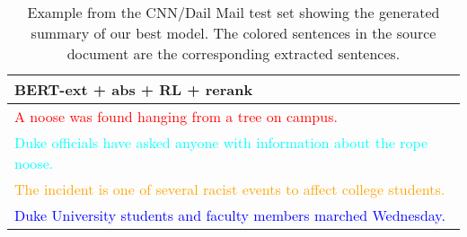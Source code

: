 \documentclass[11pt,a4paper]{article}
\begin{document}
\begin{table*}
\begin{adjustbox}{width=\textwidth}
\begin{tabular}{|p{15cm}|}
   \hline
   \bf BERT-ext + abs + RL + rerank \\
   \hline
   \textcolor{red}{A noose was found hanging from a tree on campus.}\\
   \textcolor{cyan}{Duke officials have asked anyone with information about the rope noose.}\\
   \textcolor{orange}{The incident is one of several racist events to affect college students.}\\
   \textcolor{blue}{Duke University students and faculty members marched Wednesday.}\\
   \hline
\end{tabular}
\end{adjustbox}
\caption{\label{table:example1} Example from the CNN/Dail Mail test set showing the generated summary of our best model. The colored sentences in the source document are the corresponding extracted sentences.}
\end{table*}


\clearpage
\end{document}
